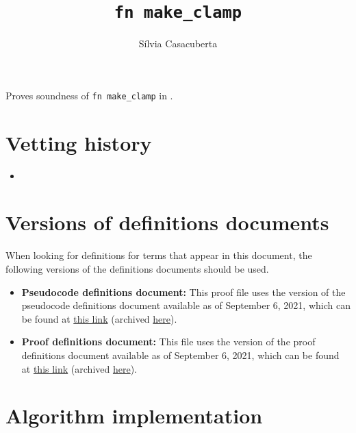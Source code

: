 \documentclass{article}
\title{\texttt{fn make\_clamp}}
\author{S\'ilvia Casacuberta}
\date{}
\begin{document}
\maketitle

\contrib
Proves soundness of \texttt{fn make\_clamp} in .


\section{Vetting history}
\begin{itemize}
    \item {}
\end{itemize}

\section{Versions of definitions documents}
\label{sec:versioned-docs}

When looking for definitions for terms that appear in this document, the following versions of the definitions documents should be used.

\begin{itemize}
    \item \textbf{Pseudocode definitions document:} This proof file uses the version of the pseudocode definitions document available as of September 6, 2021, which can be found at \href{https://github.com/opendp/whitepapers/blob/f8b279ab249934182f306138fa14e6390ddae3e9/pseudocode-defns/pseudocode_defns.pdf}{this link} (archived \href{https://web.archive.org/web/20210906201546/https://raw.githubusercontent.com/opendp/whitepapers/pseudocode-defns/pseudocode-defns/pseudocode_defns.pdf}{here}).
    
    \item \textbf{Proof definitions document:} This file uses the version of the proof definitions document available as of September 6, 2021, which can be found at \href{https://github.com/opendp/whitepapers/blob/d4c24e55cc37878634fec0b7f5c89259a3ad3ded/proof-defns/proof_defns.pdf}{this link} (archived \href{https://web.archive.org/web/20210906201056/https://raw.githubusercontent.com/opendp/whitepapers/proof-defns/proof-defns/proof_defns.pdf}{here}). 
\end{itemize}

\section{Algorithm implementation}
\end{document}
